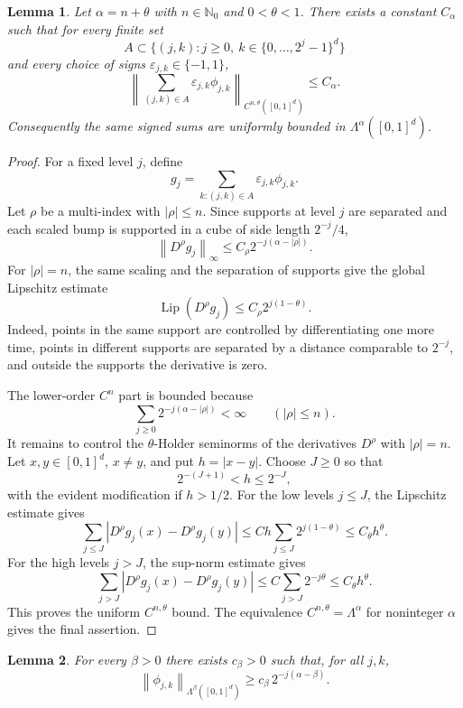 \documentclass[11pt]{article}
\newtheorem{lemma}{Lemma}
\newcommand{\N}{\mathbb{N}}
\newcommand{\eps}{\varepsilon}
\newcommand{\Lam}{\Lambda}
\newcommand{\norm}[1]{\left\lVert #1\right\rVert}
\newcommand{\abs}[1]{\left\lvert #1\right\rvert}
\begin{document}
\begin{lemma}\label{lem:signed-domain-bound}
Let \(\alpha=n+\theta\) with \(n\in\N_0\) and \(0<\theta<1\). There exists a
constant \(C_\alpha\) such that for every finite set
\[
  A\subset \{(j,k):j\ge0,\ k\in\{0,\ldots,2^j-1\}^d\}
\]
and every choice of signs \(\eps_{j,k}\in\{-1,1\}\),
\[
  \left\|
    \sum_{(j,k)\in A}\eps_{j,k}\phi_{j,k}
  \right\|_{C^{n,\theta}([0,1]^d)}
  \le C_\alpha .
\]
Consequently the same signed sums are uniformly bounded in
\(\Lam^\alpha([0,1]^d)\).
\end{lemma}

\begin{proof}
For a fixed level \(j\), define
\[
  g_j=\sum_{k:(j,k)\in A}\eps_{j,k}\phi_{j,k}.
\]
Let \(\rho\) be a multi-index with \(\abs{\rho}\le n\). Since supports at
level \(j\) are separated and each scaled bump is supported in a cube of
side length \(2^{-j}/4\),
\[
  \norm{D^\rho g_j}_\infty
  \le C_\rho 2^{-j(\alpha-\abs{\rho})}.
\]
For \(\abs{\rho}=n\), the same scaling and the separation of supports give
the global Lipschitz estimate
\[
  \operatorname{Lip}(D^\rho g_j)
  \le C_\rho 2^{j(1-\theta)}.
\]
Indeed, points in the same support are controlled by differentiating one more
time, points in different supports are separated by a distance comparable to
\(2^{-j}\), and outside the supports the derivative is zero.

The lower-order \(C^n\) part is bounded because
\[
  \sum_{j\ge0}2^{-j(\alpha-\abs{\rho})}<\infty
  \qquad (\abs{\rho}\le n).
\]
It remains to control the \(\theta\)-Holder seminorms of the derivatives
\(D^\rho\) with \(\abs{\rho}=n\). Let \(x,y\in[0,1]^d\), \(x\ne y\), and put
\(h=\abs{x-y}\). Choose \(J\ge0\) so that
\[
  2^{-(J+1)}<h\le 2^{-J},
\]
with the evident modification if \(h>1/2\). For the low levels \(j\le J\),
the Lipschitz estimate gives
\[
  \sum_{j\le J}\abs{D^\rho g_j(x)-D^\rho g_j(y)}
  \le
  C h \sum_{j\le J}2^{j(1-\theta)}
  \le C_\theta h^\theta .
\]
For the high levels \(j>J\), the sup-norm estimate gives
\[
  \sum_{j>J}\abs{D^\rho g_j(x)-D^\rho g_j(y)}
  \le
  C\sum_{j>J}2^{-j\theta}
  \le C_\theta h^\theta .
\]
This proves the uniform \(C^{n,\theta}\) bound. The equivalence
\(C^{n,\theta}=\Lam^\alpha\) for noninteger \(\alpha\) gives the final
assertion.
\end{proof}

\begin{lemma}\label{lem:target-lower-bound}
For every \(\beta>0\) there exists \(c_\beta>0\) such that, for all \(j,k\),
\[
  \norm{\phi_{j,k}}_{\Lam^\beta([0,1]^d)}
  \ge c_\beta\,2^{-j(\alpha-\beta)}.
\]
\end{lemma}
\end{document}
